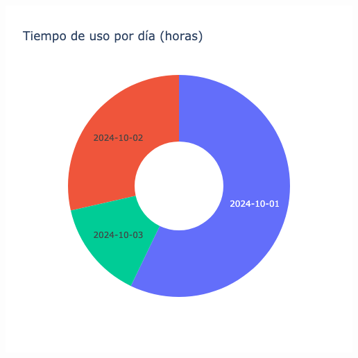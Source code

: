 \documentclass{article}
\begin{document}
    \begin{minipage}{0.48\textwidth}
        \centering
        \includegraphics[width=\textwidth]{../img/pie/UD101-90Dias-03-12-2024.png}
    \end{minipage}
    
\end{document}
